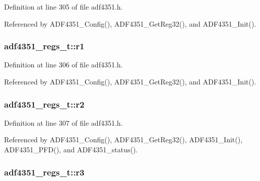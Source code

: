 Definition at line 305 of file adf4351.\+h.



Referenced by A\+D\+F4351\+\_\+\+Config(), A\+D\+F4351\+\_\+\+Get\+Reg32(), and A\+D\+F4351\+\_\+\+Init().

\subsubsection[{\texorpdfstring{r1}{r1}}]{ adf4351\+\_\+regs\+\_\+t\+::r1}\hypertarget{structadf4351__regs__t_a9e35aa252797cdae6d46ae0daad2bc40}{}\label{structadf4351__regs__t_a9e35aa252797cdae6d46ae0daad2bc40}


Definition at line 306 of file adf4351.\+h.



Referenced by A\+D\+F4351\+\_\+\+Config(), A\+D\+F4351\+\_\+\+Get\+Reg32(), and A\+D\+F4351\+\_\+\+Init().

\subsubsection[{\texorpdfstring{r2}{r2}}]{ adf4351\+\_\+regs\+\_\+t\+::r2}\hypertarget{structadf4351__regs__t_af6667dbbd7434e0394cc9f569d3e24bb}{}\label{structadf4351__regs__t_af6667dbbd7434e0394cc9f569d3e24bb}


Definition at line 307 of file adf4351.\+h.



Referenced by A\+D\+F4351\+\_\+\+Config(), A\+D\+F4351\+\_\+\+Get\+Reg32(), A\+D\+F4351\+\_\+\+Init(), A\+D\+F4351\+\_\+\+P\+F\+D(), and A\+D\+F4351\+\_\+status().

\subsubsection[{\texorpdfstring{r3}{r3}}]{ adf4351\+\_\+regs\+\_\+t\+::r3}\hypertarget{structadf4351__regs__t_a1aa968491b1182f3ae4f426ef5c1b83a}{}\label{structadf4351__regs__t_a1aa968491b1182f3ae4f426ef5c1b83a}


